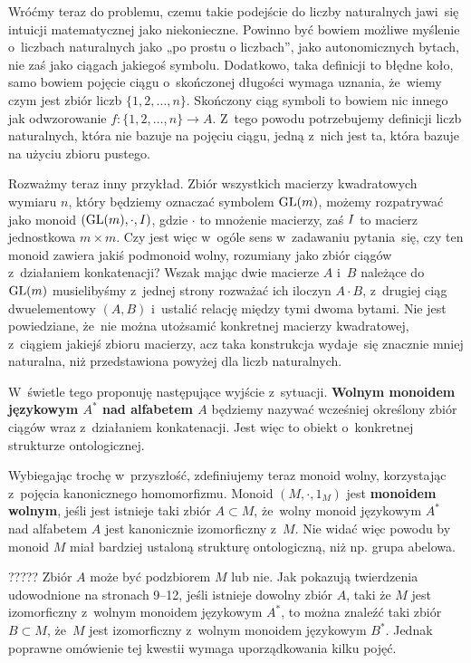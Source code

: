 \documentclass[a4paper,11pt]{article}
\begin{document}
Wróćmy teraz do problemu, czemu takie podejście do liczby naturalnych
jawi~się intuicji matematycznej jako niekonieczne. Powinno być bowiem
możliwe myślenie o~liczbach naturalnych jako „po prostu o liczbach”,
jako autonomicznych bytach, nie zaś jako ciągach jakiegoś symbolu.
Dodatkowo, taka definicji to błędne koło, samo bowiem pojęcie ciągu
o~skończonej długości wymaga uznania, że~wiemy czym jest zbiór liczb
$\{ 1, 2, \ldots, n \}$. Skończony ciąg symboli to bowiem nic innego jak
odwzorowanie $f : \{ 1, 2, \ldots, n \} \to A$. Z~tego powodu potrzebujemy
definicji liczb naturalnych, która nie bazuje na pojęciu ciągu, jedną
z~nich jest ta, która bazuje na użyciu zbioru pustego.

Rozważmy teraz inny przykład. Zbiór wszystkich macierzy kwadratowych
wymiaru $n$, który będziemy oznaczać symbolem $\mathrm{GL}( m )$, możemy
rozpatrywać jako monoid $( \mathrm{GL}( m ), \cdot, I )$, gdzie $\cdot$
to mnożenie macierzy, zaś $I$ to macierz jednostkowa
$m \times m$. Czy jest więc w~ogóle sens w~zadawaniu pytania~się, czy
ten monoid zawiera jakiś podmonoid wolny, rozumiany jako zbiór ciągów
z~działaniem konkatenacji? Wszak mając dwie macierze $A$ i~$B$
należące do $\mathrm{GL}( m )$ musielibyśmy z~jednej strony rozważać ich
iloczyn $A \cdot B$, z~drugiej ciąg dwuelementowy $( A, B )$ i~ustalić
relację między tymi dwoma bytami. Nie jest powiedziane, że~nie można
utożsamić konkretnej macierzy kwadratowej, z~ciągiem jakiejś zbioru
macierzy, acz taka konstrukcja wydaje~się znacznie mniej naturalna,
niż przedstawiona powyżej dla liczb naturalnych.

W~świetle tego proponuję następujące wyjście z~sytuacji.
\textbf{Wolnym monoidem językowym $A^{ * }$ nad alfabetem $A$}
będziemy nazywać wcześniej określony zbiór ciągów wraz z~działaniem
konkatenacji. Jest więc to obiekt o~konkretnej strukturze
ontologicznej.

Wybiegając trochę w~przyszłość, zdefiniujemy teraz monoid wolny, korzystając
z~pojęcia kanonicznego homomorfizmu. Monoid $( M, \cdot, 1_{ M } )$ jest
\textbf{monoidem wolnym}, jeśli jest istnieje taki zbiór $A \subset M$, że~wolny
monoid językowym $A^{ * }$ nad alfabetem $A$ jest kanonicznie izomorficzny
z~$M$. Nie widać więc powodu by monoid $M$ miał bardziej ustaloną strukturę ontologiczną, niż np. grupa abelowa.

????? Zbiór $A$ może być podzbiorem
$M$ lub nie. Jak pokazują twierdzenia udowodnione na stronach 9--12,
jeśli istnieje dowolny zbiór $A$, taki że $M$ jest izomorficzny
z~wolnym monoidem językowym $A^{ * }$, to można znaleźć taki zbiór
$B \subset M$, że~$M$ jest izomorficzny z~wolnym monoidem językowym
$B^{ * }$. Jednak poprawne omówienie tej kwestii wymaga uporządkowania
kilku pojęć.
\end{document}
